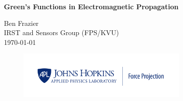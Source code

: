 \titlepage
\thispagestyle{fancy}
\begin{center}
\vspace*{50pt}
{\huge \bfseries Green's Functions in Electromagnetic Propagation\\}

\vspace{75 pt}

\Large Ben Frazier \\
\large IRST and Sensors Group (FPS/KVU)\\
\vspace{25pt}
\large \today \\

\begin{figure}[!b]
\begin{center}
\includegraphics[width=0.75\textwidth]{../media/FP_Blue.png}
\end{center}
\end{figure}

\end{center}

